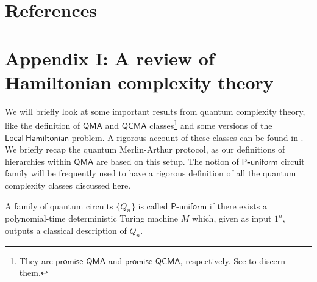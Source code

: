 \documentclass[11pt]{article}
\newcommand{\ms}[1]{\mathsf{#1}}
\begin{document}
\section{References}


\newpage
\section{Appendix I: A review of Hamiltonian complexity theory}
We will briefly look at some important results from quantum complexity theory, like the definition of $\mathsf{QMA}$ and $\mathsf{QCMA}$ classes\footnote{They are $\mathsf{promise}$-$\mathsf{QMA}$ and $\mathsf{promise}$-$\mathsf{QCMA}$, respectively. See \cite{gharibian2024guest} to discern them.} and some versions of the $\mathsf{Local\ Hamiltonian}$ problem. A rigorous account of these classes can be found in \cite{gharibian2024guest}. We briefly recap the quantum Merlin-Arthur protocol, as our definitions of hierarchies within $\mathsf{QMA}$ are based on this setup. The notion of \textbf{$\mathsf{P}$-$\mathsf{uniform}$} circuit family will be frequently used to have a rigorous definition of all the quantum complexity classes discussed here.
\begin{definition}
     A family of quantum circuits $\{Q_n\}$ is called $\mathsf{P}$-$\mathsf{uniform}$ if there exists a polynomial-time deterministic Turing machine $M$ which, given as input $1^n$, outputs a classical description of $Q_n$.  
\end{definition}
\end{document}
